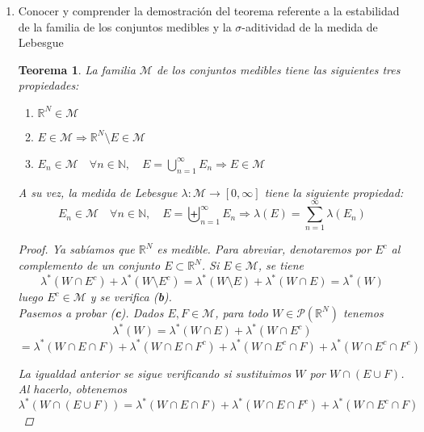 \documentclass[a4paper, 12pt]{article}
\newtheorem{teorema}{Teorema}
\begin{document}
\begin{enumerate}[label=\textbf{\arabic*}.]
	\item Conocer y comprender la demostración del teorema referente a la estabilidad de la familia de los conjuntos medibles y la \(\sigma\)-aditividad de la medida de Lebesgue
	
\begin{teorema}
La familia \(\mathcal{M}\) de los conjuntos medibles tiene las siguientes tres propiedades:
	\begin{enumerate}[label=(\textbf{\alph*})]
	
	\item \(\mathbb{R}^N \in \mathcal{M}\)
	\item \(E \in \mathcal{M} \Rightarrow \mathbb{R}^N \setminus E \in \mathcal{M}\)
	\item \(E_n \in \mathcal{M} \quad \forall n \in \mathbb{N}, \quad E = \bigcup_{n=1}^{\infty} E_n \Rightarrow E \in \mathcal{M}\)
	
	\end{enumerate}
	
A su vez, la medida de Lebesgue \(\lambda: \mathcal{M} \to [0, \infty]\) tiene la siguiente propiedad:
\begin{equation}\label{estabilidad}
 E_n \in \mathcal{M} \quad \forall n \in \mathbb{N}, \quad E = \biguplus_{n=1}^{\infty} E_n \Longrightarrow \lambda(E) = \sum_{n=1}^{\infty} \lambda (E_n)
\end{equation}

\begin{proof}
Ya sabíamos que \(\mathbb{R}^N\) es medible. Para abreviar, denotaremos por \(E^c\) al complemento de un conjunto \(E \subset \mathbb{R}^N\). Si \(E \in \mathcal{M}\), se tiene
\[
	\lambda^*(W \cap E^c) + \lambda^*(W \setminus E^c) = \lambda^* (W \setminus E) + \lambda^* (W \cap E) = \lambda^* (W)
\]
luego \(E^c \in \mathcal{M}\) y se verifica (\textbf{b}). \\

Pasemos a probar (\textbf{c}). Dados \(E, F \in \mathcal{M}\), para todo \(W \in \mathcal{P} ( \mathbb{R}^N)\) tenemos
\begin{equation}\label{paso_1}
\lambda^* (W) = \lambda^*(W \cap E) + \lambda^* (W \cap E^c) 
\end{equation}
\[
 = \lambda^*(W \cap E \cap F) + \lambda^*(W \cap E \cap F^c) + \lambda^*(W \cap E^c \cap F) + \lambda^*(W \cap E^c \cap F^c)
\]

La igualdad anterior se sigue verificando si sustituimos \(W\) por \(W \cap (E \cup F)\). Al hacerlo, obtenemos
\begin{equation}\label{paso_2}
\lambda^* (W \cap (E \cup F)) = \lambda^* (W \cap E \cap F) + \lambda^* (W \cap E \cap F^c) + \lambda^* (W \cap E^c \cap F)
\end{equation}


\end{proof}
\end{teorema}
\end{enumerate}
\end{document}
